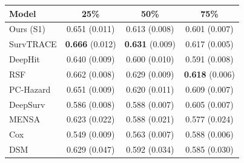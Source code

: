 \begin{tabular}{lccc}
\toprule
Model & 25\% & 50\% & 75\% \\
\midrule
Ours (S1) & 0.651 (0.011) & 0.613 (0.008) & 0.601 (0.007) \\
SurvTRACE & \textbf{0.666} (0.012) & \textbf{0.631} (0.009) & 0.617 (0.005) \\
DeepHit & 0.640 (0.009) & 0.600 (0.010) & 0.591 (0.008) \\
RSF & 0.662 (0.008) & 0.629 (0.009) & \textbf{0.618} (0.006) \\
PC-Hazard & 0.651 (0.009) & 0.620 (0.011) & 0.609 (0.007) \\
DeepSurv & 0.586 (0.008) & 0.588 (0.007) & 0.605 (0.007) \\
MENSA & 0.623 (0.022) & 0.588 (0.021) & 0.577 (0.024) \\
Cox & 0.549 (0.009) & 0.563 (0.007) & 0.588 (0.006) \\
DSM & 0.629 (0.047) & 0.592 (0.034) & 0.585 (0.030) \\
\bottomrule
\end{tabular}
